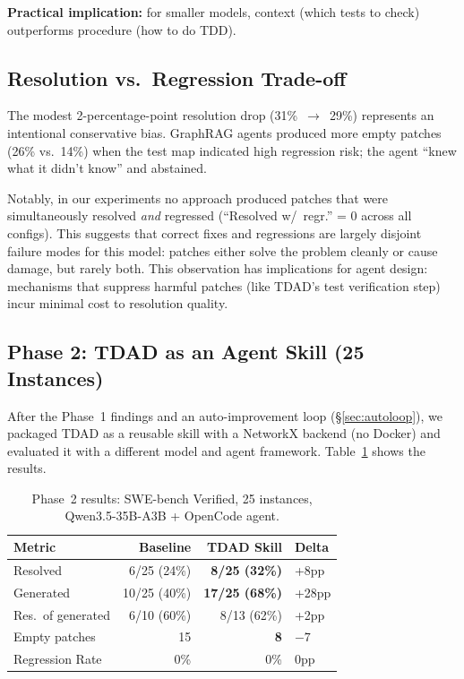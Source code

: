 \documentclass[sigconf,nonacm]{acmart}
\begin{document}
\textbf{Practical implication:} for smaller models, context (which tests to
check) outperforms procedure (how to do TDD).

\subsection{Resolution vs.\ Regression Trade-off}

The modest 2-percentage-point resolution drop (31\%~$\to$~29\%) represents an
intentional conservative bias.  GraphRAG agents produced more empty patches
(26\% vs.\ 14\%) when the test map indicated high regression risk; the agent
``knew what it didn't know'' and abstained.

Notably, in our experiments no approach produced patches that were simultaneously resolved
\emph{and} regressed (``Resolved w/~regr.'' = 0 across all configs).  This
suggests that correct fixes and regressions are largely disjoint failure
modes for this model: patches either solve the problem cleanly or cause
damage, but rarely both.  This observation has implications for agent design:
mechanisms that suppress harmful patches (like \textsc{TDAD}'s test
verification step) incur minimal cost to resolution quality.

\subsection{Phase 2: TDAD as an Agent Skill (25 Instances)}

After the Phase~1 findings and an auto-improvement loop
(\S\ref{sec:autoloop}), we packaged \textsc{TDAD} as a reusable skill with a
NetworkX backend (no Docker) and evaluated it with a different model and agent
framework.  Table~\ref{tab:phase2} shows the results.

\begin{table}[t]
\caption{Phase~2 results: SWE-bench Verified, 25 instances,
  Qwen3.5-35B-A3B + OpenCode agent.}
\label{tab:phase2}
\small
\begin{tabular}{@{}lrrl@{}}
\toprule
\textbf{Metric} & \textbf{Baseline} & \textbf{TDAD Skill} & \textbf{Delta} \\
\midrule
Resolved          & 6/25 (24\%) & \textbf{8/25 (32\%)} & +8pp \\
Generated         & 10/25 (40\%) & \textbf{17/25 (68\%)} & +28pp \\
Res.\ of generated & 6/10 (60\%) & 8/13 (62\%) & +2pp \\
Empty patches     & 15           & \textbf{8}            & $-7$ \\
Regression Rate   & 0\%          & 0\%                   & 0pp \\
\bottomrule
\end{tabular}
\end{table}
\end{document}
